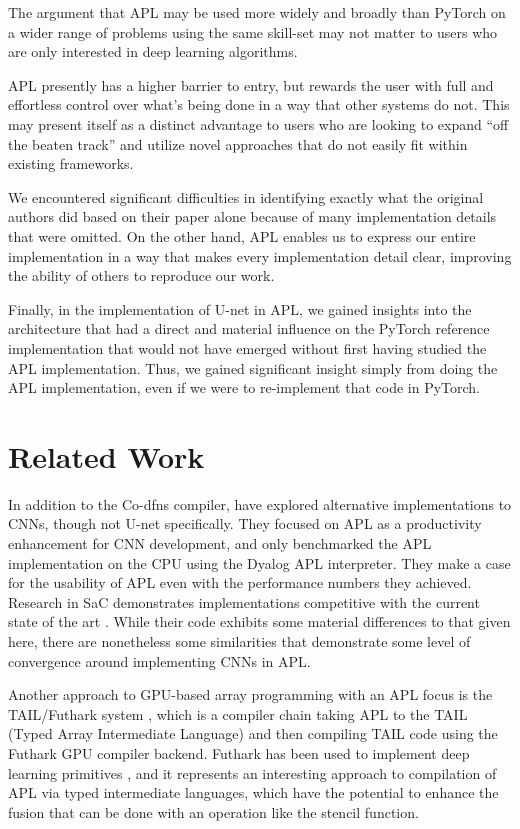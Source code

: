 \documentclass[10pt,twocolumn,english,format=sigplan,screen,balance]{acmart}
\begin{document}
The argument that APL may be used more widely and broadly than PyTorch
on a wider range of problems using the same skill-set may not matter
to users who are only interested in deep learning algorithms. 

APL presently has a higher barrier to entry, but rewards the user
with full and effortless control over what's being done in a way that
other systems do not. This may present itself as a distinct advantage
to users who are looking to expand “off the beaten track” and
utilize novel approaches that do not easily fit within existing frameworks. 

We encountered significant difficulties in identifying exactly what
the original authors did based on their paper alone because of many
implementation details that were omitted. On the other hand, APL enables
us to express our entire implementation in a way that makes every
implementation detail clear, improving the ability of others to reproduce
our work.

Finally, in the implementation of U-net in APL, we gained insights
into the architecture that had a direct and material influence on
the PyTorch reference implementation that would not have emerged without
first having studied the APL implementation. Thus, we gained significant
insight simply from doing the APL implementation, even if we were
to re-implement that code in PyTorch. 

\section{Related Work}

In addition to the Co-dfns compiler, \citet{bernecky-cnn} have explored
alternative implementations to CNNs, though not U-net specifically.
They focused on APL as a productivity enhancement for CNN development,
and only benchmarked the APL implementation on the CPU using the Dyalog
APL interpreter. They make a case for the usability of APL even with
the performance numbers they achieved. Research in SaC demonstrates
implementations competitive with the current state of the art \citep{sac-cnn}.
While their code exhibits some material differences to that given
here, there are nonetheless some similarities that demonstrate some
level of convergence around implementing CNNs in APL.

Another approach to GPU-based array programming with an APL focus
is the TAIL/Futhark system \citep{futhark}, which is a compiler chain
taking APL to the TAIL (Typed Array Intermediate Language) and then
compiling TAIL code using the Futhark GPU compiler backend. Futhark
has been used to implement deep learning primitives \citep{futhark-deeplearning},
and it represents an interesting approach to compilation of APL via
typed intermediate languages, which have the potential to enhance
the fusion that can be done with an operation like the stencil function. 
\end{document}
